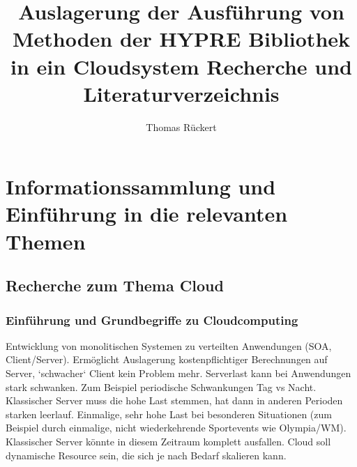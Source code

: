 \documentclass[a4paper,10pt]{article}
\title{Auslagerung der Ausführung von Methoden der HYPRE Bibliothek in ein Cloudsystem
Recherche und Literaturverzeichnis}
\author{Thomas Rückert}
\begin{document}
\newenvironment{boxed}[1]
{\begin{center}Definition\\
\begin{tabular}{|p{0.9\textwidth}|}
\hline\\
\textbf{#1}\\\\
}
{
\\\\\hline
\end{tabular} 
\end{center}
}

\newcommand{\mycheckbox}[0]{\makebox[0pt][l]{$\square$}\raisebox{0.15ex}{\hspace{0.1em}$\checkmark$}}
\newcommand{\myuncheckbox}[0]{\makebox[0em][l]{$\square$}\raisebox{0.15ex}{\hspace{0.1em}$ $}}

\maketitle
\newpage

\begin{abstract}

\end{abstract}

\newpage

\tableofcontents
\listoftodos

\newpage

\section{Informationssammlung und Einführung in die relevanten Themen}

\subsection{Recherche zum Thema Cloud}

\subsubsection{Einführung und Grundbegriffe zu Cloudcomputing}

Entwicklung von monolitischen Systemen zu verteilten Anwendungen (SOA, Client/Server).
Ermöglicht Auslagerung kostenpflichtiger Berechnungen auf Server, `schwacher` Client kein Problem mehr.
Serverlast kann bei Anwendungen stark schwanken.
Zum Beispiel periodische Schwankungen Tag vs Nacht.
Klassischer Server muss die hohe Last stemmen, hat dann in anderen Perioden starken leerlauf.
Einmalige, sehr hohe Last bei besonderen Situationen (zum Beispiel durch einmalige, nicht wiederkehrende Sportevents wie Olympia/WM).
Klassischer Server könnte in diesem Zeitraum komplett ausfallen.
Cloud soll dynamische Resource sein, die sich je nach Bedarf skalieren kann.
\end{document}
